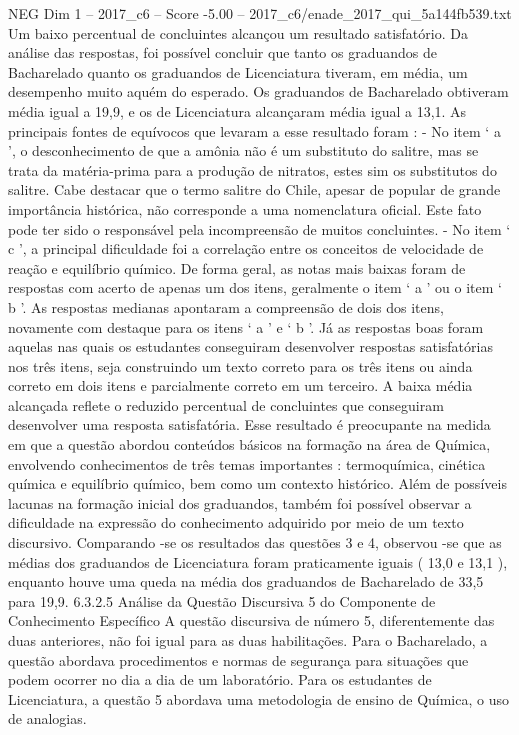 \begin{textsample}{NEG Dim 1 – 2017\_c6 – Score -5.00 – 2017\_c6/enade\_2017\_qui\_5a144fb539.txt}
Um baixo percentual de concluintes alcançou um resultado satisfatório.
Da análise das respostas, foi possível concluir que tanto os graduandos de Bacharelado quanto os graduandos de Licenciatura tiveram, em média, um desempenho muito aquém do esperado.
Os graduandos de Bacharelado obtiveram média igual a 19,9, e os de Licenciatura alcançaram média igual a 13,1.
As principais fontes de equívocos que levaram a esse resultado foram : - No item ‘ a ’, o desconhecimento de que a amônia não é um substituto do salitre, mas se trata da matéria-prima para a produção de nitratos, estes sim os substitutos do salitre.
Cabe destacar que o termo salitre do Chile, apesar de popular de grande importância histórica, não corresponde a uma nomenclatura oficial.
Este fato pode ter sido o responsável pela incompreensão de muitos concluintes. - No item ‘ c ’, a principal dificuldade foi a correlação entre os conceitos de velocidade de reação e equilíbrio químico.
De forma geral, as notas mais baixas foram de respostas com acerto de apenas um dos itens, geralmente o item ‘ a ’ ou o item ‘ b ’.
As respostas medianas apontaram a compreensão de dois dos itens, novamente com destaque para os itens ‘ a ’ e ‘ b ’.
Já as respostas boas foram aquelas nas quais os estudantes conseguiram desenvolver respostas satisfatórias nos três itens, seja construindo um texto correto para os três itens ou ainda correto em dois itens e parcialmente correto em um terceiro.
A baixa média alcançada reflete o reduzido percentual de concluintes que conseguiram desenvolver uma resposta satisfatória.
Esse resultado é preocupante na medida em que a questão abordou conteúdos básicos na formação na área de Química, envolvendo conhecimentos de três temas importantes : termoquímica, cinética química e equilíbrio químico, bem como um contexto histórico.
Além de possíveis lacunas na formação inicial dos graduandos, também foi possível observar a dificuldade na expressão do conhecimento adquirido por meio de um texto discursivo.
Comparando -se os resultados das questões 3 e 4, observou -se que as médias dos graduandos de Licenciatura foram praticamente iguais ( 13,0 e 13,1 ), enquanto houve uma queda na média dos graduandos de Bacharelado de 33,5 para 19,9. 6.3.2.5 Análise da Questão Discursiva 5 do Componente de Conhecimento Específico A questão discursiva de número 5, diferentemente das duas anteriores, não foi igual para as duas habilitações.
Para o Bacharelado, a questão abordava procedimentos e normas de segurança para situações que podem ocorrer no dia a dia de um laboratório.
Para os estudantes de Licenciatura, a questão 5 abordava uma metodologia de ensino de Química, o uso de analogias.

\end{textsample}
